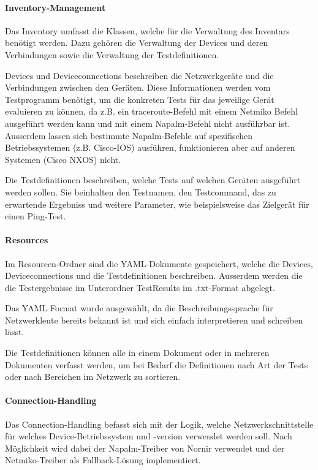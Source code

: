 \documentclass[]{subfiles}
\begin{document}
\paragraph{Inventory-Management}
Das Inventory umfasst die Klassen, welche für die Verwaltung des Inventars benötigt werden.
Dazu gehören die Verwaltung der Devices und deren Verbindungen sowie die Verwaltung der 
Testdefinitionen.

Devices und Deviceconnections beschreiben die Netzwerkgeräte und die Verbindungen zwischen
den Geräten. 
Diese Informationen werden vom Testprogramm benötigt, um die konkreten Tests für das 
jeweilige Gerät evaluieren zu können, da z.B. ein traceroute-Befehl mit einem Netmiko
Befehl ausgeführt werden kann und mit einem Napalm-Befehl nicht ausführbar ist.
Ausserdem lassen sich bestimmte Napalm-Befehle auf spezifischen Betriebssystemen 
(z.B. Cisco-IOS) ausführen, funktionieren aber auf anderen Systemen (Cisco NXOS) nicht.

Die Testdefinitionen beschreiben, welche Tests auf welchen Geräten ausgeführt werden sollen.
Sie beinhalten den Testnamen, den Testcommand, das zu erwartende Ergebniss und weitere Parameter,
wie beispielsweise das Zielgerät für einen Ping-Test.

\paragraph{Resources}
Im Resourcen-Ordner sind die YAML-Dokumente gespeichert, welche die Devices, Deviceconnections
und die Testdefinitionen beschreiben. Ausserdem werden die die Testergebnisse im Unterordner
TestResults im .txt-Format abgelegt.

Das YAML Format wurde ausgewählt, da die Beschreibungssprache für Netzwerkleute bereits bekannt
ist und sich einfach interpretieren und schreiben lässt.

Die Testdefinitionen können alle in einem Dokument oder in mehreren Dokumenten verfasst werden,
um bei Bedarf die Definitionen nach Art der Tests oder nach Bereichen im Netzwerk zu sortieren.

\paragraph{Connection-Handling}
Das Connection-Handling befasst sich mit der Logik, welche Netzwerkschnittstelle für welches
Device-Betriebssystem und -version verwendet werden soll. 
Nach Möglichkeit wird dabei der Napalm-Treiber von Nornir verwendet und der Netmiko-Treiber
als Fallback-Lösung implementiert.
\end{document}
